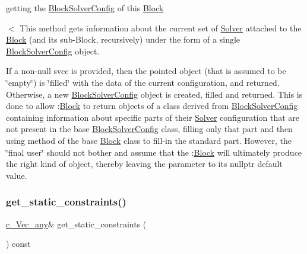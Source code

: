 getting the \mbox{\hyperlink{class_s_m_spp__di__unipi__it_1_1_block_solver_config}{Block\+Solver\+Config}} of this \mbox{\hyperlink{class_s_m_spp__di__unipi__it_1_1_block}{Block}} 

$<$ This method gets information about the current set of \mbox{\hyperlink{class_s_m_spp__di__unipi__it_1_1_solver}{Solver}} attached to the \mbox{\hyperlink{class_s_m_spp__di__unipi__it_1_1_block}{Block}} (and its sub-\/\+Block, recursively) under the form of a single \mbox{\hyperlink{class_s_m_spp__di__unipi__it_1_1_block_solver_config}{Block\+Solver\+Config}} object.

If a non-\/null svcc is provided, then the pointed object (that is assumed to be \char`\"{}empty\char`\"{}) is \char`\"{}filled\char`\"{} with the data of the current configuration, and returned. Otherwise, a new \mbox{\hyperlink{class_s_m_spp__di__unipi__it_1_1_block_solver_config}{Block\+Solver\+Config}} object is created, filled and returned. This is done to allow \+:\mbox{\hyperlink{class_s_m_spp__di__unipi__it_1_1_block}{Block}} to return objects of a class derived from \mbox{\hyperlink{class_s_m_spp__di__unipi__it_1_1_block_solver_config}{Block\+Solver\+Config}} containing information about specific parts of their \mbox{\hyperlink{class_s_m_spp__di__unipi__it_1_1_solver}{Solver}} configuration that are not present in the base \mbox{\hyperlink{class_s_m_spp__di__unipi__it_1_1_block_solver_config}{Block\+Solver\+Config}} class, filling only that part and then using method of the base \mbox{\hyperlink{class_s_m_spp__di__unipi__it_1_1_block}{Block}} class to fill-\/in the standard part. However, the \char`\"{}final
user\char`\"{} should not bother and assume that the \+:\mbox{\hyperlink{class_s_m_spp__di__unipi__it_1_1_block}{Block}} will ultimately produce the right kind of object, thereby leaving the parameter to its nullptr default value. \mbox{\label{class_s_m_spp__di__unipi__it_1_1_block_afaf2dca465cd70d9d76bcfe839e52aec}} 
\subsubsection{\texorpdfstring{get\+\_\+static\+\_\+constraints()}{get\_static\_constraints()}}
{\footnotesize\ttfamily \mbox{\hyperlink{group___s_m_s__types_gaa16aeddc7a50d64299ee0f8d9ca5dc7d}{c\+\_\+\+Vec\+\_\+any}}\& get\+\_\+static\+\_\+constraints (\begin{DoxyParamCaption}\item[{void}]{ }\end{DoxyParamCaption}) const\hspace{0.3cm}{\ttfamily [inline]}}



